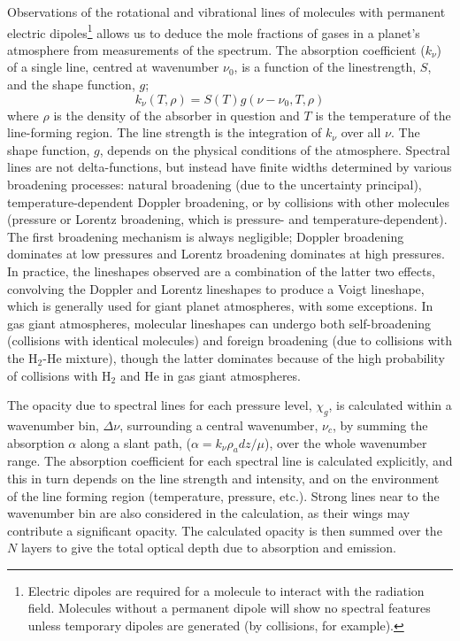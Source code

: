 \documentclass[final,5p,times,twocolumn,authoryear]{elsarticle}
\begin{document}
Observations of the rotational and vibrational lines of molecules with permanent electric dipoles\footnote{Electric dipoles are required for a molecule to interact with the radiation field.  Molecules without a permanent dipole will show no spectral features unless temporary dipoles are generated (by collisions, for example).} allows us to deduce the mole fractions of gases in a planet's atmosphere from measurements of the spectrum.  The absorption coefficient ($k_\nu$) of a single line, centred at wavenumber $\nu_0$, is a function of the linestrength, $S$, and the shape function, $g$;
\begin{equation}
k_\nu(T,\rho)=S(T)g(\nu-\nu_0,T,\rho)
\end{equation}
where $\rho$ is the density of the absorber in question and $T$ is the temperature of the line-forming region.  The line strength is the integration of $k_\nu$ over all $\nu$.  The shape function, $g$, depends on the physical conditions of the atmosphere.  Spectral lines are not delta-functions, but instead have finite widths determined by various broadening processes: natural broadening (due to the uncertainty principal), temperature-dependent Doppler broadening, or by collisions with other molecules (pressure or Lorentz broadening, which is pressure- and temperature-dependent).  The first broadening mechanism is always negligible; Doppler broadening dominates at low pressures and Lorentz broadening dominates at high pressures.  In practice, the lineshapes observed are a combination of the latter two effects, convolving the Doppler and Lorentz lineshapes to produce a Voigt lineshape, which is generally used for giant planet atmospheres, with some exceptions.  In gas giant atmospheres, molecular lineshapes can undergo both self-broadening (collisions with identical molecules) and foreign broadening (due to collisions with the H$_2$-He mixture), though the latter dominates because of the high probability of collisions with H$_2$ and He in gas giant atmospheres.

The opacity due to spectral lines for each pressure level, $\chi_g$, is calculated within a wavenumber bin, $\Delta \nu$, surrounding a central wavenumber, $\nu_c$, by summing the absorption $\alpha$ along a slant path, ($\alpha=k_{\nu}\rho_a dz/\mu$), over the whole wavenumber range.  The absorption coefficient for each spectral line is calculated explicitly, and this in turn depends on the line strength and intensity, and on the environment of the line forming region (temperature, pressure, etc.).  Strong lines near to the wavenumber bin are also considered in the calculation, as their wings may contribute a significant opacity. The calculated opacity is then summed over the $N$ layers to give the total optical depth due to absorption and emission.
\end{document}
